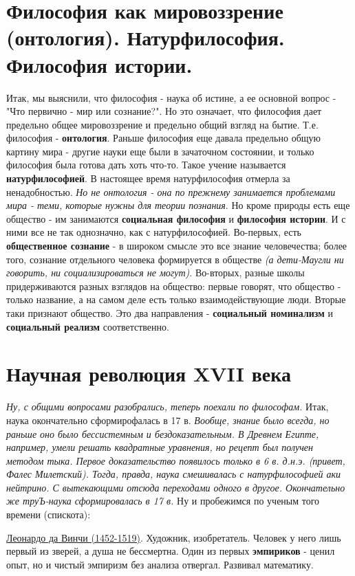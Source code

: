 \section{Философия как мировоззрение (онтология). Натурфилософия. Философия истории.}
Итак, мы выяснили, что философия - наука об истине, а ее основной вопрос - "Что первично - мир или сознание?". Но это означает, что философия дает предельно общее мировоззрение и предельно общий взгляд на бытие. Т.е. философия - \textbf{онтология}. Раньше философия еще давала предельно общую картину мира - другие науки еще были в зачаточном состоянии, и только философия была готова дать хоть что-то. Такое учение называется \textbf{натурфилософией}. В настоящее время натурфилософия отмерла за ненадобностью. \textit{Но не онтология - она по прежнему занимается проблемами мира - теми, которые нужны для теории познания}. Но кроме природы есть еще общество - им занимаются \textbf{социальная философия} и \textbf{философия истории}. И с ними все не так однозначно, как с натурфилософией. Во-первых, есть \textbf{общественное сознание} - в широком смысле это все знание человечества; более того, сознание отдельного человека формируется в обществе \textit{(а дети-Маугли ни говорить, ни социализироваться не могут)}. Во-вторых, разные школы придерживаются разных взглядов на общество: первые говорят, что общество - только название, а на самом деле есть только взаимодействующие люди. Вторые таки признают общество. Это два направления - \textbf{социальный номинализм} и \textbf{социальный реализм} соответственно.

\section{Научная революция XVII века}
\textit{Ну, с общими вопросами разобрались, теперь поехали по философам.} Итак, наука окончательно сформирофалась в 17 в. \textit{Вообще, знание было всегда, но раньше оно было бессистемным и бездоказательным. В Древнем Египте, например, умели решать квадратные уравнения, но рецепт был получен методом тыка. Первое доказательство появилось только в 6 в. д.н.э. (привет, Фалес Милетский). Тогда, правда, наука смешивалась с натурфилософией аки нейтрино. С вытекающими отсюда переходами одного в другое. Окончательно же труЪ-наука сформировалась в 17 в.}
Ну и пробежимся по ученым того времени (спискота):

\underline{Леонардо да Винчи (1452-1519)}. Художник, изобретатель. Человек у него лишь первый из зверей, а душа не бессмертна. Один из первых \textbf{эмпириков} - ценил опыт, но и чистый эмпиризм без анализа отвергал. Развивал математику.


